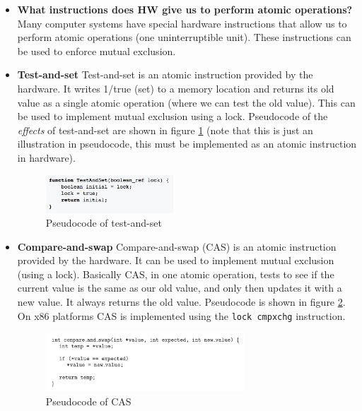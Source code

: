 \documentclass[12pt]{article}
\begin{document}
\begin{itemize}
    \item \textbf{What instructions does HW give us to perform atomic operations?} Many computer systems have special hardware instructions that allow us to perform atomic operations (one uninterruptible unit). These instructions can be used to enforce mutual exclusion.
    \item \textbf{Test-and-set} Test-and-set is an atomic instruction provided by the hardware. It writes 1/true (set) to a memory location and returns its old value as a single atomic operation (where we can test the old value). This can be used to implement mutual exclusion using a lock. Pseudocode of the \textit{effects} of test-and-set are shown in figure \ref{fig:test-and-set} (note that this is just an illustration in pseudocode, this must be implemented as an atomic instruction in hardware).
    \begin{figure}[ht]
        \centering
        \includegraphics[width=0.45\textwidth]{figures/test-and-set.jpg}
        \caption{Pseudocode of test-and-set}
        \label{fig:test-and-set}
    \end{figure}
\item \textbf{Compare-and-swap} Compare-and-swap (CAS) is an atomic instruction provided by the hardware. It can be used to implement mutual exclusion (using a lock). Basically CAS, in one atomic operation, tests to see if the current value is the same as our old value, and only then updates it with a new value. It always returns the old value. Pseudocode is shown in figure \ref{fig:cas}. On x86 platforms CAS is implemented using the \texttt{lock cmpxchg} instruction.
    \begin{figure}[ht]
        \centering
        \includegraphics[width=0.7\textwidth]{figures/cas.jpg}
        \caption{Pseudocode of CAS}
        \label{fig:cas}
    \end{figure}
\end{itemize}
\end{document}

